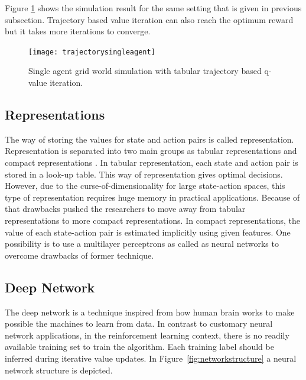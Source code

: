 \documentclass{ituphdreport}
\begin{document}
Figure \ref{fig:trajectorysingleagent} shows the simulation result for the same setting that is given in previous subsection. Trajectory based value iteration can also reach the optimum reward but it takes more iterations to converge. 

\begin{figure}[h]
	\begin{center}
		\texttt{[image: trajectorysingleagent]}
	\end{center}
	\caption{Single agent grid world simulation with tabular trajectory based q-value iteration.
		\label{fig:trajectorysingleagent}}
\end{figure}

\subsection{Representations}
The way of storing the values for state and action pairs is called representation. Representation is separated into two main groups as tabular representations and compact representations \cite{geramifard:1}. In tabular representation, each state and action pair is stored in a look-up table. This way of representation gives optimal decisions. However, due to the curse-of-dimensionality for large state-action spaces, this type of representation requires huge memory in practical applications. Because of that drawbacks pushed the researchers to move away from tabular representations to more compact representations. In compact representations, the value of each state-action pair is estimated implicitly using given features. One possibility is to use a multilayer perceptrons as called as neural networks to overcome drawbacks of former technique.

\subsection{Deep Network}
The deep network is a technique inspired from how human brain works to make possible the machines to learn from data. In contrast to customary neural network applications, in the reinforcement learning context, there is no readily available training set to train the algorithm. Each training label should be inferred during iterative value updates. In Figure~\ref{fig:networkstructure} a neural network structure is depicted.
\end{document}
